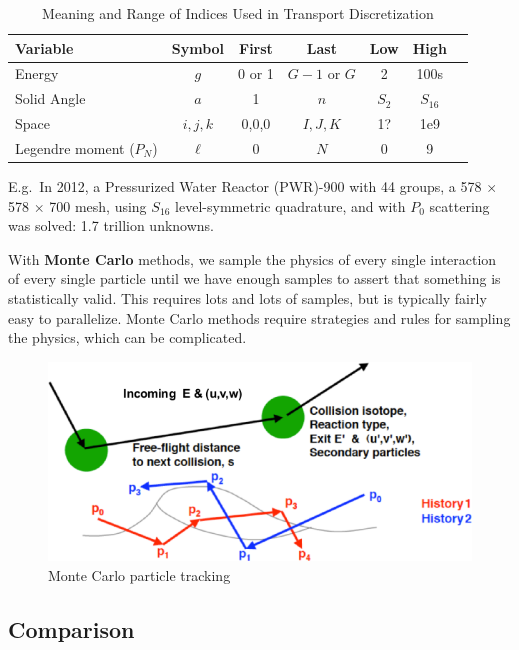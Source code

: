 \documentclass[12pt]{article}
\begin{document}
\begin{table}[!h]
\caption{Meaning and Range of Indices Used in Transport Discretization}
\begin{center}
\begin{tabular}{l c c c c c c}
\hline
Variable & Symbol & First & Last & Low & High \\[0.5ex]
\hline
Energy & $g$ & 0 or 1 & $G-1$ or $G$ & 2 & 100s \\
Solid Angle & $a$ & 1 & $n$ & $S_2$ & $S_{16}$ \\
Space & $i,j,k$ & 0,0,0 & $I,J,K$ & 1? & 1e9 \\
Legendre moment ($P_{N}$) & $\ell$ & 0 & $N$ & 0 & 9 \\
\hline
\end{tabular}
\end{center}
\label{table:index}
\end{table}

E.g.\ In 2012, a Pressurized Water Reactor (PWR)-900 with 44 groups, a 578
$\times$ 578 $\times$ 700 mesh, using $S_{16}$ level-symmetric quadrature, and 
with $P_{0}$ scattering was solved: 1.7 trillion unknowns.

With \textbf{Monte Carlo} methods, we sample the physics of every single interaction 
of every single particle until we have enough samples to assert that something 
is statistically valid. This requires lots and lots of samples, but is 
typically fairly easy to parallelize. Monte Carlo methods require strategies and 
rules for sampling the physics, which can be complicated. 

\begin{figure}[h!]
    \begin{center}
    \includegraphics[keepaspectratio, width = 4 in]{MC}
    \end{center}
    \caption{Monte Carlo particle tracking}
    \label{fig:mc}
\end{figure}

\subsection*{Comparison}
\end{document}
